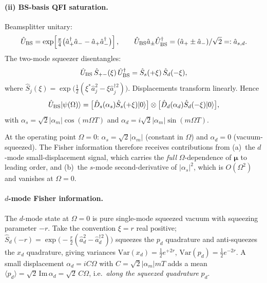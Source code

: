 \documentclass[11pt]{article}
\begin{document}
\paragraph{(ii) BS-basis QFI saturation.}  Beamsplitter unitary:
\begin{equation}
  \hat U_{\rm BS} = \exp\!\left[\tfrac{\pi}{4}\bigl(
    \hat a_+^\dag\hat a_- - \hat a_+\hat a_-^\dag\bigr)\right],
  \qquad
  \hat U_{\rm BS}\hat a_\pm\hat U_{\rm BS}^\dag =
  (\hat a_+\pm\hat a_-)/\sqrt2 =: \hat a_{s,d}.
\end{equation}
The two-mode squeezer disentangles:
\begin{equation}
  \hat U_{\rm BS}\,\hat S_{+-}(\xi)\,\hat U_{\rm BS}^\dag
  = \hat S_s(+\xi)\,\hat S_d(-\xi),
\end{equation}
where $\hat S_j(\xi) = \exp\bigl(\tfrac12(\xi^*\hat a_j^2
- \xi\hat a_j^{\dag 2})\bigr)$.  Displacements transform linearly.
Hence
\begin{equation}
  \hat U_{\rm BS}|\psi(\Omega)\rangle
  = \bigl[\hat D_s(\alpha_s)\hat S_s(+\xi)|0\rangle\bigr]
    \otimes\bigl[\hat D_d(\alpha_d)\hat S_d(-\xi)|0\rangle\bigr],
  \label{eq:BS_basis_factorization}
\end{equation}
with $\alpha_s = \sqrt2|\alpha_m|\cos(m\Omega T)$ and
$\alpha_d = i\sqrt2|\alpha_m|\sin(m\Omega T)$.

At the operating point $\Omega=0$: $\alpha_s = \sqrt2|\alpha_m|$
(constant in $\Omega$) and $\alpha_d = 0$ (vacuum-squeezed).  The
Fisher information therefore receives contributions from
(a)~the $d$-mode small-displacement signal, which carries the
\emph{full} $\Omega$-dependence of $\boldsymbol\mu$ to leading order,
and (b)~the $s$-mode second-derivative of $|\alpha_s|^2$, which is
$O(\Omega^2)$ and vanishes at $\Omega=0$.

\paragraph{$d$-mode Fisher information.}  The $d$-mode state at
$\Omega=0$ is pure single-mode squeezed vacuum with squeezing
parameter $-r$.  Take the convention $\xi=r$ real positive;
$\hat S_d(-r) = \exp\bigl(-\tfrac{r}{2}(\hat a_d^2 - \hat a_d^{\dag 2})
\bigr)$ squeezes the $p_d$ quadrature and anti-squeezes the $x_d$
quadrature, giving variances
$\mathrm{Var}(x_d) = \tfrac12 e^{+2r}$,
$\mathrm{Var}(p_d) = \tfrac12 e^{-2r}$.  A small displacement
$\alpha_d = iC\Omega$ with $C = \sqrt2|\alpha_m|mT$ adds a mean
$\langle p_d\rangle = \sqrt2\,\mathrm{Im}\,\alpha_d
= \sqrt2\,C\Omega$, i.e.\ \emph{along the squeezed quadrature}
$p_d$.
\end{document}
